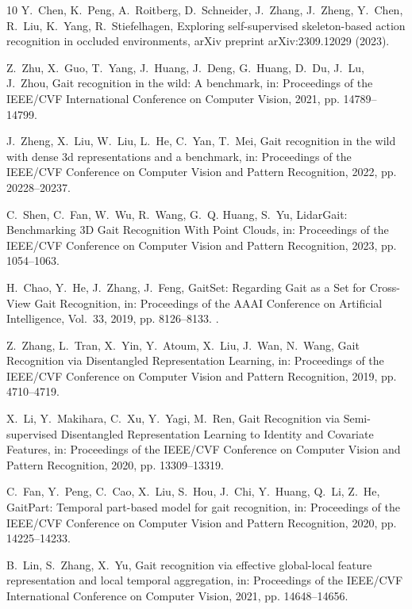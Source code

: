 \documentclass[review,12pt]{elsarticle}
\begin{document}
\begin{thebibliography}{10}
Y.~Chen, K.~Peng, A.~Roitberg, D.~Schneider, J.~Zhang, J.~Zheng, Y.~Chen,
  R.~Liu, K.~Yang, R.~Stiefelhagen, Exploring self-supervised skeleton-based
  action recognition in occluded environments, {arXiv preprint
  arXiv:2309.12029} (2023).

Z.~Zhu, X.~Guo, T.~Yang, J.~Huang, J.~Deng, G.~Huang, D.~Du, J.~Lu, J.~Zhou,
  Gait recognition in the wild: A benchmark, in: {Proceedings of the IEEE/CVF
  International Conference on Computer Vision}, 2021, pp. 14789--14799.

J.~Zheng, X.~Liu, W.~Liu, L.~He, C.~Yan, T.~Mei, Gait recognition in the wild
  with dense 3d representations and a benchmark, in: {Proceedings of the
  IEEE/CVF Conference on Computer Vision and Pattern Recognition}, 2022, pp.
  20228--20237.

C.~Shen, C.~Fan, W.~Wu, R.~Wang, G.~Q. Huang, S.~Yu, {LidarGait: Benchmarking
  3D Gait Recognition With Point Clouds}, in: {Proceedings of the IEEE/CVF
  Conference on Computer Vision and Pattern Recognition}, 2023, pp. 1054--1063.

H.~Chao, Y.~He, J.~Zhang, J.~Feng, {GaitSet: Regarding Gait as a Set for
  Cross-View Gait Recognition}, in: {Proceedings of the AAAI Conference on
  Artificial Intelligence}, Vol.~33, 2019, pp. 8126--8133.
\newblock \href {https://doi.org/10.1609/aaai.v33i01.33018126}
  {}.

Z.~Zhang, L.~Tran, X.~Yin, Y.~Atoum, X.~Liu, J.~Wan, N.~Wang, {Gait Recognition
  via Disentangled Representation Learning}, in: {Proceedings of the IEEE/CVF
  Conference on Computer Vision and Pattern Recognition}, 2019, pp. 4710--4719.

X.~Li, Y.~Makihara, C.~Xu, Y.~Yagi, M.~Ren, {Gait Recognition via
  Semi-supervised Disentangled Representation Learning to Identity and
  Covariate Features}, in: {Proceedings of the IEEE/CVF Conference on Computer
  Vision and Pattern Recognition}, 2020, pp. 13309--13319.

C.~Fan, Y.~Peng, C.~Cao, X.~Liu, S.~Hou, J.~Chi, Y.~Huang, Q.~Li, Z.~He,
  {GaitPart}: Temporal part-based model for gait recognition, in: {Proceedings
  of the IEEE/CVF Conference on Computer Vision and Pattern Recognition}, 2020,
  pp. 14225--14233.

B.~Lin, S.~Zhang, X.~Yu, Gait recognition via effective global-local feature
  representation and local temporal aggregation, in: {Proceedings of the
  IEEE/CVF International Conference on Computer Vision}, 2021, pp.
  14648--14656.


\end{thebibliography}
\end{document}
